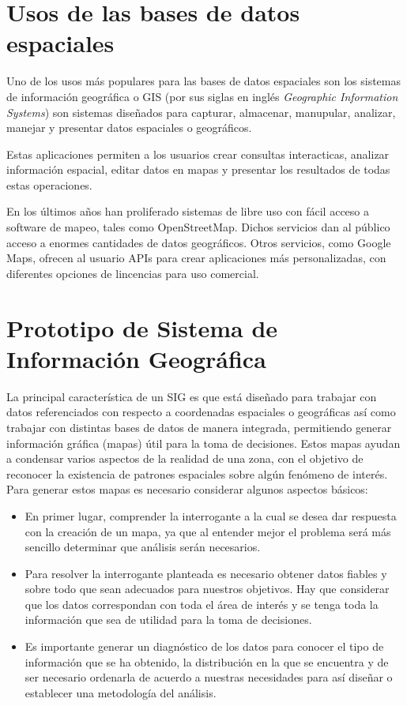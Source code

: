 \documentclass{article}
\begin{document}
\section{Usos de las bases de datos espaciales}
Uno de los usos m\'as populares para las bases de datos espaciales son los sistemas de informaci\'on geogr\'afica o GIS (por sus siglas en ingl\'es \emph{Geographic Information Systems}) son sistemas dise\~nados para capturar, almacenar, manupular, analizar, manejar y presentar datos espaciales o geogr\'aficos.

Estas aplicaciones permiten a los usuarios crear consultas interacticas, analizar informaci\'on espacial, editar datos en mapas y presentar los resultados de todas estas operaciones.

En los \'ultimos a\~nos han proliferado sistemas de libre uso con f\'acil acceso a software de mapeo, tales como OpenStreetMap. Dichos servicios dan al p\'ublico acceso a enormes cantidades de datos geogr\'aficos. Otros servicios, como Google Maps, ofrecen al usuario APIs para crear aplicaciones m\'as personalizadas, con diferentes opciones de lincencias para uso comercial.

\section {Prototipo de Sistema de Informaci\'on Geogr\'afica}

La principal caracter\'istica de un SIG es que est\'a dise\~nado para trabajar con datos referenciados con respecto a coordenadas espaciales o geogr\'aficas as\'i como trabajar con distintas bases de datos de manera integrada, permitiendo generar informaci\'on gr\'afica (mapas) \'util para la toma de decisiones. Estos mapas ayudan a condensar varios aspectos de la realidad de una zona, con el objetivo de reconocer la existencia de patrones espaciales sobre alg\'un fen\'omeno de inter\'es. \cite{gisimp} Para generar estos mapas es necesario considerar algunos aspectos b\'asicos:

\begin{itemize}
\item  En primer lugar, comprender la interrogante a la cual se desea dar respuesta con la creaci\'on de un mapa, ya que al entender mejor el problema ser\'a m\'as sencillo determinar que an\'alisis ser\'an necesarios.

\item  Para resolver la interrogante planteada es necesario obtener datos fiables y sobre todo que sean adecuados para nuestros objetivos. Hay que considerar que los datos correspondan con toda el \'area de inter\'es y se tenga toda la información que sea de utilidad para la toma de decisiones.

\item  Es importante generar un diagn\'ostico de los datos para conocer el tipo de informaci\'on que se ha obtenido, la distribuci\'on en la que se encuentra y de ser necesario ordenarla de acuerdo a nuestras necesidades para as\'i dise\~nar o establecer una metodolog\'ia del an\'alisis.

\end{itemize}
\end{document}
